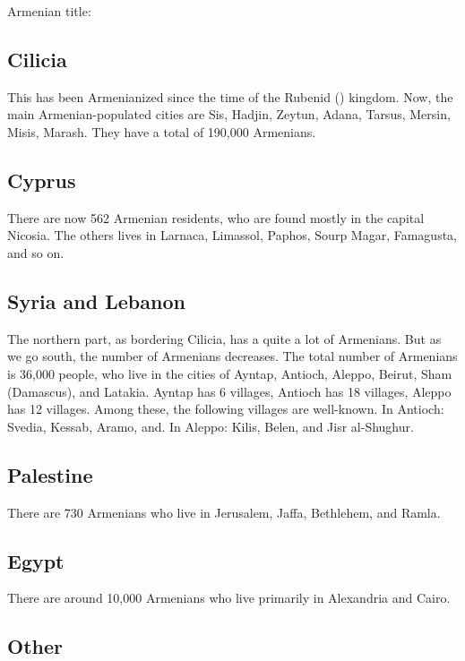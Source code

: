 Armenian title: 


\subsection{Cilicia}

This has been Armenianized since the time of the Rubenid () kingdom. Now, the main Armenian-populated cities are Sis, Hadjin, Zeytun, Adana, Tarsus, Mersin, Misis, Marash. They have a total of 190,000 Armenians.

\subsection{Cyprus}

There are now 562 Armenian residents, who are found mostly in the capital Nicosia. The others lives in Larnaca, Limassol, Paphos, Sourp Magar, Famagusta, and so on. 

\subsection{Syria and Lebanon}

The northern part, as bordering Cilicia, has a quite a lot of Armenians. But as we go south, the number of Armenians decreases. The total number of Armenians is 36,000 people, who live in the cities of Ayntap, Antioch, Aleppo, Beirut, Sham (Damascus), and Latakia. Ayntap has 6 villages, Antioch has 18 villages, Aleppo has 12 villages. Among these, the following villages are well-known. In Antioch: Svedia, Kessab, Aramo, and. In Aleppo: Kilis, Belen, and Jisr al-Shughur.

\subsection{Palestine}
There are 730 Armenians who live in Jerusalem, Jaffa, Bethlehem, and Ramla. 

\subsection{Egypt}

There are around 10,000 Armenians who live primarily in Alexandria and Cairo. 

\subsection{Other}

